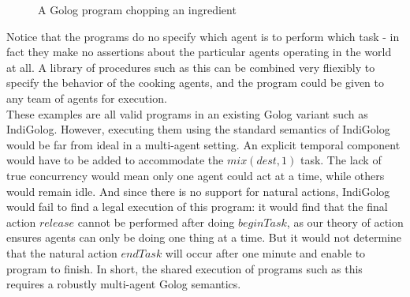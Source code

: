 %
\begin{figure}
\begin{centering}
\par\end{centering}

\caption{A Golog program chopping an ingredient\label{fig:MIndiGolog:ChopTypeInto}}

\end{figure}


Notice that the programs do no specify which agent is to perform which
task - in fact they make no assertions about the particular agents
operating in the world at all. A library of procedures such as this
can be combined very fliexibly to specify the behavior of the cooking
agents, and the program could be given to any team of agents for execution.\\


These examples are all valid programs in an existing Golog variant
such as IndiGolog. However, executing them using the standard semantics
of IndiGolog would be far from ideal in a multi-agent setting. An
explicit temporal component would have to be added to accommodate
the $mix(dest,1)$ task. The lack of true concurrency would mean only
one agent could act at a time, while others would remain idle. And
since there is no support for natural actions, IndiGolog would fail
to find a legal execution of this program: it would find that the
final action $release$ cannot be performed after doing $beginTask$,
as our theory of action ensures agents can only be doing one thing
at a time. But it would not determine that the natural action $endTask$
will occur after one minute and enable to program to finish. In short,
the shared execution of programs such as this requires a robustly
multi-agent Golog semantics.


